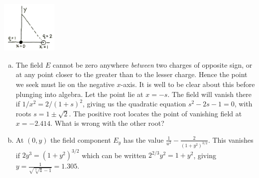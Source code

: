 \documentclass{esg8022pset}
\begin{document}
\begin{solution}
  \begin{center}\includegraphics[width=0.2\textwidth]{ps01_sol_05}\end{center}
  \begin{enumerate}[(a)]
    \item The field $E$ cannot be zero anywhere \emph{between} two charges of opposite sign, or at any point closer to the greater than to the lesser charge. Hence the point we seek must lie on the negative $x$-axis. It is well to be clear about this before plunging into algebra. Let the point lie at $x = -s$. The field will vanish there if $1 / x^2 = 2 / (1+s)^2$, giving us the quadratic equation $s^2 - 2s - 1 = 0$, with roots $s = 1 \pm \sqrt{2}$. The positive root locates the point of vanishing field at $x = -2.414$.  What is wrong with the other root?
    \item At $(0, y)$ the field component $E_y$ has the value $\frac{1}{u^2} - \frac{2}{(1 + y^2)^{3/2}}$.  This vanishes if $2y^3 = (1 + y^2)^{3/2}$ which can be written $2^{2/3}y^2 = 1 + y^2$, giving $y = \frac{1}{\sqrt{\sqrt[3]{4} - 1}} = 1.305$.
  \end{enumerate}
\end{solution}
\end{document}
